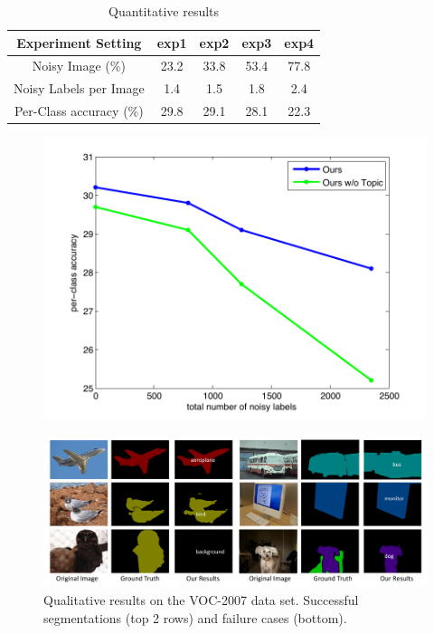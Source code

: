 \begin{table}[!h]
\begin{center}
\begin{tabular}{|c|c|c|c|c|}
\hline
Experiment Setting & exp1 & exp2 & exp3 & exp4 \\
\hline
Noisy Image (\%) & 23.2 & 33.8 & 53.4 & 77.8 \\
\hline
Noisy Labels per Image & 1.4 & 1.5 & 1.8 & 2.4 \\
\hline
Per-Class accuracy (\%) & 29.8 & 29.1 & 28.1 & 22.3 \\
\hline
\end{tabular}
\end{center}
\caption{Quantitative results  }
\label{tab:ExpNoise}
\end{table}


\begin{figure}[h]
\begin{center}
    \includegraphics[width=1\linewidth]{fig_noisylabel.pdf}
\end{center}
    \caption{}
\label{fig:noisyexp}
\end{figure}


\begin{figure}
\begin{center}
	\includegraphics[width=1\linewidth]{Fig_VOC.pdf}
\end{center}
   \caption{Qualitative results on the VOC-2007 data set. Successful segmentations (top 2 rows) and failure cases (bottom).}
\label{fig:VOC-2007}
\end{figure}

